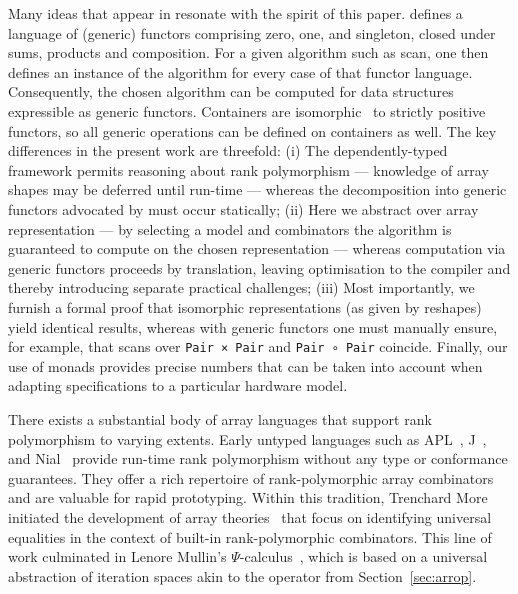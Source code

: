 Many ideas that appear in \citet{Elliott:scan} resonate with the spirit of this
paper.  \citeauthor{Elliott:scan} defines a language of (generic) functors
comprising zero, one, and singleton, closed under sums, products and
composition.  For a given algorithm such as scan, one then defines an instance
of the algorithm for every case of that functor language.  Consequently, the
chosen algorithm can be computed for data structures expressible as generic
functors.  Containers are isomorphic~\citep{ABBOTT20053} to strictly positive
functors, so all generic operations can be defined on containers as well.  The
key differences in the present work are threefold:  
%
(i)  The dependently-typed framework permits reasoning about rank polymorphism
--- knowledge of array shapes may be deferred until run-time --- whereas the
decomposition into generic functors advocated by \citeauthor{Elliott:scan} must
occur statically;  
%
(ii)  Here we abstract over array representation --- by selecting a model and
combinators the algorithm is guaranteed to compute on the chosen representation
--- whereas computation via generic functors proceeds by translation, leaving
optimisation to the compiler and thereby introducing separate practical
challenges;  
%
(iii)  Most importantly, we furnish a formal proof that isomorphic
representations (as given by reshapes) yield identical results, whereas with
generic functors one must manually ensure, for example, that scans over
\texttt{Pair × Pair} and \texttt{Pair ∘ Pair} coincide.
Finally, our use of monads provides precise numbers that can be taken
into account when adapting specifications to a particular hardware
model.

There exists a substantial body of array languages that support rank
polymorphism to varying extents.  Early untyped languages such as
APL~\citep{Iverson:1962:APL}, J~\citep{jlang}, and Nial~\citep{nial} provide
run-time rank polymorphism without any type or conformance guarantees.  They
offer a rich repertoire of rank-polymorphic array combinators and are valuable
for rapid prototyping.  Within this tradition, Trenchard More initiated the
development of array theories~\citep{More73} that focus on identifying
universal equalities in the context of built-in rank-polymorphic combinators.
This line of work culminated in Lenore Mullin's
$\Psi$-calculus~\citep{Mullin88}, which is based on a universal abstraction of
iteration spaces akin to the  operator from Section~\ref{sec:arrop}.

